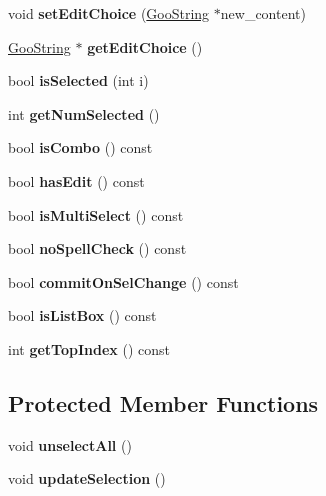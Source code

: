 \begin{DoxyCompactItemize}
void {\bfseries set\+Edit\+Choice} (\hyperlink{class_goo_string}{Goo\+String} $\ast$new\+\_\+content)
\item 
\mbox{\label{class_form_field_choice_a2fe6e161b974ca5345255dc1e1d45150}} 
\hyperlink{class_goo_string}{Goo\+String} $\ast$ {\bfseries get\+Edit\+Choice} ()
\item 
\mbox{\label{class_form_field_choice_a7aae41f139e87e243a86d77cccbff1ec}} 
bool {\bfseries is\+Selected} (int i)
\item 
\mbox{\label{class_form_field_choice_afb6d89706f7a028790c30086e23eb2d3}} 
int {\bfseries get\+Num\+Selected} ()
\item 
\mbox{\label{class_form_field_choice_a0ab47bcc41e2040712b4346614c18d94}} 
bool {\bfseries is\+Combo} () const
\item 
\mbox{\label{class_form_field_choice_a58533e664e3afbd31c96e357a9d5782e}} 
bool {\bfseries has\+Edit} () const
\item 
\mbox{\label{class_form_field_choice_ad2d195fa7309a9ee3ab8c9da40c0d4ed}} 
bool {\bfseries is\+Multi\+Select} () const
\item 
\mbox{\label{class_form_field_choice_a05b38ac359fc5d7db5258131006e7c39}} 
bool {\bfseries no\+Spell\+Check} () const
\item 
\mbox{\label{class_form_field_choice_ad90cbb3fdbf21a525a13cde7cf21eacb}} 
bool {\bfseries commit\+On\+Sel\+Change} () const
\item 
\mbox{\label{class_form_field_choice_a6f40b0ddc695865679ca7fe71ab49f69}} 
bool {\bfseries is\+List\+Box} () const
\item 
\mbox{\label{class_form_field_choice_a4ada04b3a7d90928df86c833fcd05412}} 
int {\bfseries get\+Top\+Index} () const
\end{DoxyCompactItemize}
\subsection*{Protected Member Functions}
\begin{DoxyCompactItemize}
\item 
\mbox{\label{class_form_field_choice_a52b2491f38744ff1372d5fdb4f7548d4}} 
void {\bfseries unselect\+All} ()
\item 
\mbox{\label{class_form_field_choice_a24e531200a3d00673c41759c54fcc7ac}} 
void {\bfseries update\+Selection} ()
\end{DoxyCompactItemize}
